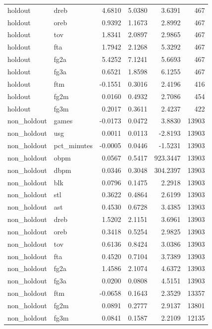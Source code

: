 \begin{table}
\begin{tabular}{llrrrr}
holdout & dreb & 4.6810 & 5.0380 & 3.6391 & 467 \\
holdout & oreb & 0.9392 & 1.1673 & 2.8992 & 467 \\
holdout & tov & 1.8341 & 2.0897 & 2.9865 & 467 \\
holdout & fta & 1.7942 & 2.1268 & 5.3292 & 467 \\
holdout & fg2a & 5.4252 & 7.1241 & 5.6693 & 467 \\
holdout & fg3a & 0.6521 & 1.8598 & 6.1255 & 467 \\
holdout & ftm & -0.1551 & 0.3016 & 2.4196 & 416 \\
holdout & fg2m & 0.0160 & 0.4932 & 2.7086 & 454 \\
holdout & fg3m & 0.2017 & 0.3611 & 2.4237 & 422 \\
non\_holdout & games & -0.0173 & 0.0472 & 3.8830 & 13903 \\
non\_holdout & usg & 0.0011 & 0.0113 & -2.8193 & 13903 \\
non\_holdout & pct\_minutes & -0.0005 & 0.0446 & -1.5231 & 13903 \\
non\_holdout & obpm & 0.0567 & 0.5417 & 923.3447 & 13903 \\
non\_holdout & dbpm & 0.0346 & 0.3048 & 304.2397 & 13903 \\
non\_holdout & blk & 0.0796 & 0.1475 & 2.2918 & 13903 \\
non\_holdout & stl & 0.3622 & 0.4864 & 2.6199 & 13903 \\
non\_holdout & ast & 0.4530 & 0.6728 & 3.4385 & 13903 \\
non\_holdout & dreb & 1.5202 & 2.1151 & 3.6961 & 13903 \\
non\_holdout & oreb & 0.3418 & 0.5254 & 2.9825 & 13903 \\
non\_holdout & tov & 0.6136 & 0.8424 & 3.0386 & 13903 \\
non\_holdout & fta & 0.4520 & 0.7104 & 3.7389 & 13903 \\
non\_holdout & fg2a & 1.4586 & 2.1074 & 4.6372 & 13903 \\
non\_holdout & fg3a & 0.0200 & 0.0808 & 4.5151 & 13903 \\
non\_holdout & ftm & -0.0658 & 0.1643 & 2.3529 & 13357 \\
non\_holdout & fg2m & 0.0891 & 0.2777 & 2.9137 & 13801 \\
non\_holdout & fg3m & 0.0841 & 0.1587 & 2.2109 & 12135 \\
\bottomrule
\end{tabular}
\end{table}
